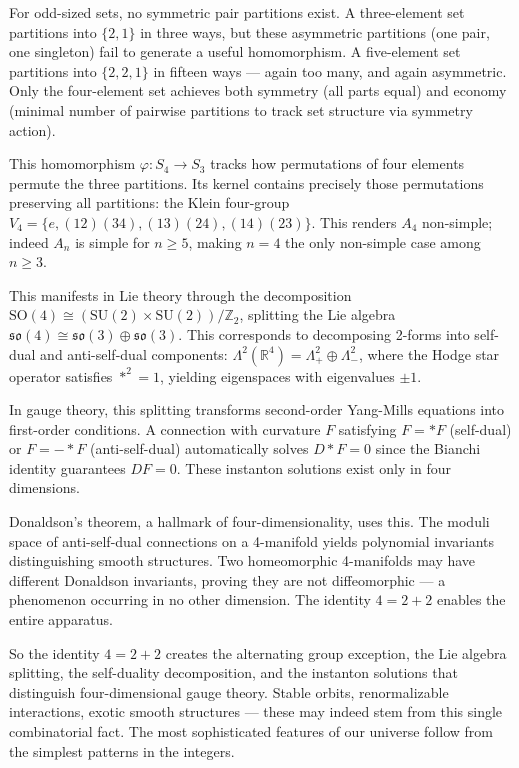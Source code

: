 For odd-sized sets, no symmetric pair partitions exist. A three-element set partitions into $\{2,1\}$ in three ways, but these asymmetric partitions (one pair, one singleton) fail to generate a useful homomorphism. A five-element set partitions into $\{2,2,1\}$ in fifteen ways — again too many, and again asymmetric. Only the four-element set achieves both symmetry (all parts equal) and economy (minimal number of pairwise partitions to track set structure via symmetry action).

This homomorphism $\varphi: S_4 \to S_3$ tracks how permutations of four elements permute the three partitions. Its kernel contains precisely those permutations preserving all partitions: the Klein four-group $V_4 = \{e, (12)(34), (13)(24), (14)(23)\}$. This renders $A_4$ non-simple; indeed $A_n$ is simple for $n\ge 5$, making $n=4$ the only non-simple case among $n\ge 3$.

This manifests in Lie theory through the decomposition $\mathrm{SO}(4) \cong (\mathrm{SU}(2) \times \mathrm{SU}(2))/\mathbb{Z}_2$, splitting the Lie algebra $\mathfrak{so}(4) \cong \mathfrak{so}(3) \oplus \mathfrak{so}(3)$. This corresponds to decomposing 2-forms into self-dual and anti-self-dual components: $\Lambda^2(\mathbb{R}^4) = \Lambda^2_+ \oplus\Lambda^2_-$, where the Hodge star operator satisfies $*^2 = 1$, yielding eigenspaces with eigenvalues $\pm 1$.

In gauge theory, this splitting transforms second-order Yang-Mills equations into first-order conditions. A connection with curvature $F$ satisfying $F = *F$ (self-dual) or $F = -*F$ (anti-self-dual) automatically solves $D*F = 0$ since the Bianchi identity guarantees $DF = 0$. These instanton solutions exist only in four dimensions.

Donaldson's theorem, a hallmark of four-dimensionality, uses this. The moduli space of anti-self-dual connections on a 4-manifold yields polynomial invariants distinguishing smooth structures. Two homeomorphic 4-manifolds may have different Donaldson invariants, proving they are not diffeomorphic — a phenomenon occurring in no other dimension. The identity $4 = 2 + 2$ enables the entire apparatus.

So the identity $4 = 2 + 2$ creates the alternating group exception, the Lie algebra splitting, the self-duality decomposition, and the instanton solutions that distinguish four-dimensional gauge theory. Stable orbits, renormalizable interactions, exotic smooth structures — these may indeed stem from this single combinatorial fact. The most sophisticated features of our universe follow from the simplest patterns in the integers.


